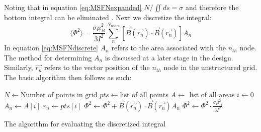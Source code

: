 Noting that in equation \ref{eq:MSFNexpanded} $N/\iint ds = \sigma$ and therefore the bottom integral can be eliminated \cite{fluxNoiseSquidsStevenAnton}. Next we discretize the integral: 
\begin{equation}
    \langle \Phi ^2 \rangle = \frac{\sigma\mu_B^2}{3I^2}\sum_{n}^{N_{\text{nodes}}}[\Vec{B}(\Vec{r_n})\cdot\Vec{B}(\Vec{r_n})]A_n
    \label{eq:MSFNdiscrete}
\end{equation}
In equation \ref{eq:MSFNdiscrete} $A_n$ refers to the area associated with the $n_{th}$ node. The method for determining $A_n$ is discussed at a later stage in the design. Similarly, $\Vec{r_n}$ refers to the vector position of the $n_{th}$ node in the unstructured grid. The basic algorithm then follows as such:
\begin{algorithm}
\begin{algorithmic}
    \State $N \gets \text{Number of points in grid}$
    \State $pts \gets \text{list of all points}$
    \State $A \gets $ list of all areas
    \State $i \gets 0$ 
        \State $A_n \gets A[i]$
        \State $r_n \gets pts[i]$ 
        \State $\Phi^2 \gets \Phi^2 + \Vec{B}(\Vec{r_n})\cdot \Vec{B}(\Vec{r_n}) A_n$ 
    \EndWhile
    \State $\Phi^2 \gets \Phi^2 \cdot \frac{\sigma\mu_B^2}{3I^2}$ 
\end{algorithmic}
\caption{The algorithm for evaluating the discretized integral}
\end{algorithm}


